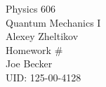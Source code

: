 \begin{titlepage}
\setlength{\topmargin}{1.5in}
\begin{center}
\Huge{Physics 606} \\
\LARGE{Quantum Mechanics I} \\
\Large{Alexey Zheltikov} \\[1cm]

\huge{Homework \#\HWnum}\\[0.5cm]

\large{Joe Becker} \\
\large{UID: 125-00-4128} \\
\large{\due} 

\end{center}

\end{titlepage}

